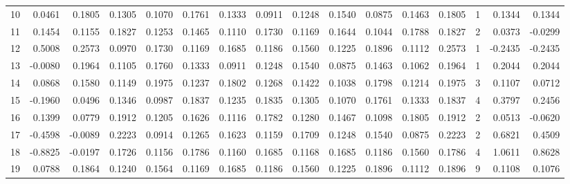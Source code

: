 \begin{tabular}{lrrrrrrrrrrrrrrr}
10 &      0.0461 &  0.1805 &  0.1305 &  0.1070 &  0.1761 &  0.1333 &  0.0911 &  0.1248 &  0.1540 &  0.0875 &   0.1463 &     0.1805 &      1 &                    0.1344 &                     0.1344 \\
11 &      0.1454 &  0.1155 &  0.1827 &  0.1253 &  0.1465 &  0.1110 &  0.1730 &  0.1169 &  0.1644 &  0.1044 &   0.1788 &     0.1827 &      2 &                    0.0373 &                    -0.0299 \\
12 &      0.5008 &  0.2573 &  0.0970 &  0.1730 &  0.1169 &  0.1685 &  0.1186 &  0.1560 &  0.1225 &  0.1896 &   0.1112 &     0.2573 &      1 &                   -0.2435 &                    -0.2435 \\
13 &     -0.0080 &  0.1964 &  0.1105 &  0.1760 &  0.1333 &  0.0911 &  0.1248 &  0.1540 &  0.0875 &  0.1463 &   0.1062 &     0.1964 &      1 &                    0.2044 &                     0.2044 \\
14 &      0.0868 &  0.1580 &  0.1149 &  0.1975 &  0.1237 &  0.1802 &  0.1268 &  0.1422 &  0.1038 &  0.1798 &   0.1214 &     0.1975 &      3 &                    0.1107 &                     0.0712 \\
15 &     -0.1960 &  0.0496 &  0.1346 &  0.0987 &  0.1837 &  0.1235 &  0.1835 &  0.1305 &  0.1070 &  0.1761 &   0.1333 &     0.1837 &      4 &                    0.3797 &                     0.2456 \\
16 &      0.1399 &  0.0779 &  0.1912 &  0.1205 &  0.1626 &  0.1116 &  0.1782 &  0.1280 &  0.1467 &  0.1098 &   0.1805 &     0.1912 &      2 &                    0.0513 &                    -0.0620 \\
17 &     -0.4598 & -0.0089 &  0.2223 &  0.0914 &  0.1265 &  0.1623 &  0.1159 &  0.1709 &  0.1248 &  0.1540 &   0.0875 &     0.2223 &      2 &                    0.6821 &                     0.4509 \\
18 &     -0.8825 & -0.0197 &  0.1726 &  0.1156 &  0.1786 &  0.1160 &  0.1685 &  0.1168 &  0.1685 &  0.1186 &   0.1560 &     0.1786 &      4 &                    1.0611 &                     0.8628 \\
19 &      0.0788 &  0.1864 &  0.1240 &  0.1564 &  0.1169 &  0.1685 &  0.1186 &  0.1560 &  0.1225 &  0.1896 &   0.1112 &     0.1896 &      9 &                    0.1108 &                     0.1076 \\
\bottomrule
\end{tabular}
